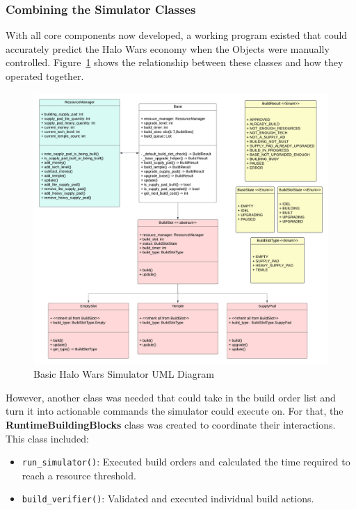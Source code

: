 \documentclass[a4paper, 12pt, english]{article}
\begin{document}
\subsubsection{Combining the Simulator Classes}

With all core components now developed, a working program existed that could accurately predict the Halo Wars economy when the Objects were manually controlled. Figure~\ref{fig:SimulatorUML} shows the relationship between these classes and how they operated together.
\newline


\begin{figure}[!ht]
    \begin{center}
        \includegraphics[width=150mm,scale=1.0]{HaloWarsDiagram.png}
    \end{center}
    \caption{\label{fig:SimulatorUML}Basic Halo Wars Simulator UML Diagram}
\end{figure}


However, another class was needed that could take in the build order list and turn it into actionable commands the simulator could execute on. For that, the \textbf{RuntimeBuildingBlocks} class was created to coordinate their interactions. This class included:
\begin{itemize}
    \item \texttt{run\_simulator()}: Executed build orders and calculated the time required to reach a resource threshold.
    \item \texttt{build\_verifier()}: Validated and executed individual build actions.
\end{itemize}
\end{document}
